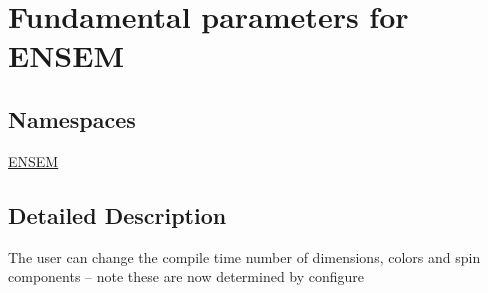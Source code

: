 \hypertarget{group__params}{}\section{Fundamental parameters for E\+N\+S\+EM}
\label{group__params}
\subsection*{Namespaces}
\begin{DoxyCompactItemize}
\item 
 \mbox{\hyperlink{namespaceENSEM}{E\+N\+S\+EM}}
\end{DoxyCompactItemize}


\subsection{Detailed Description}
The user can change the compile time number of dimensions, colors and spin components -- note these are now determined by configure 